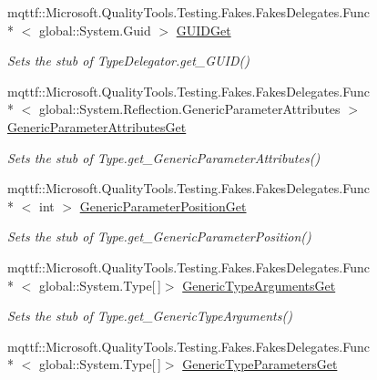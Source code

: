 \begin{DoxyCompactItemize}
mqttf\-::\-Microsoft.\-Quality\-Tools.\-Testing.\-Fakes.\-Fakes\-Delegates.\-Func\\*
$<$ global\-::\-System.\-Guid $>$ \hyperlink{class_system_1_1_reflection_1_1_fakes_1_1_stub_type_delegator_aac3ba8a1bb19e7d3879d708bd54fe156}{G\-U\-I\-D\-Get}
\begin{DoxyCompactList}\small\item\em Sets the stub of Type\-Delegator.\-get\-\_\-\-G\-U\-I\-D()\end{DoxyCompactList}\item 
mqttf\-::\-Microsoft.\-Quality\-Tools.\-Testing.\-Fakes.\-Fakes\-Delegates.\-Func\\*
$<$ global\-::\-System.\-Reflection.\-Generic\-Parameter\-Attributes $>$ \hyperlink{class_system_1_1_reflection_1_1_fakes_1_1_stub_type_delegator_a8bf19976cc8abea414f6892241768330}{Generic\-Parameter\-Attributes\-Get}
\begin{DoxyCompactList}\small\item\em Sets the stub of Type.\-get\-\_\-\-Generic\-Parameter\-Attributes()\end{DoxyCompactList}\item 
mqttf\-::\-Microsoft.\-Quality\-Tools.\-Testing.\-Fakes.\-Fakes\-Delegates.\-Func\\*
$<$ int $>$ \hyperlink{class_system_1_1_reflection_1_1_fakes_1_1_stub_type_delegator_ac1a2e3a2d09a1886b517906f65c48d19}{Generic\-Parameter\-Position\-Get}
\begin{DoxyCompactList}\small\item\em Sets the stub of Type.\-get\-\_\-\-Generic\-Parameter\-Position()\end{DoxyCompactList}\item 
mqttf\-::\-Microsoft.\-Quality\-Tools.\-Testing.\-Fakes.\-Fakes\-Delegates.\-Func\\*
$<$ global\-::\-System.\-Type\mbox{[}$\,$\mbox{]}$>$ \hyperlink{class_system_1_1_reflection_1_1_fakes_1_1_stub_type_delegator_aa72ee4f1371ea3b3bfa8b6a27cc5cdcc}{Generic\-Type\-Arguments\-Get}
\begin{DoxyCompactList}\small\item\em Sets the stub of Type.\-get\-\_\-\-Generic\-Type\-Arguments()\end{DoxyCompactList}\item 
mqttf\-::\-Microsoft.\-Quality\-Tools.\-Testing.\-Fakes.\-Fakes\-Delegates.\-Func\\*
$<$ global\-::\-System.\-Type\mbox{[}$\,$\mbox{]}$>$ \hyperlink{class_system_1_1_reflection_1_1_fakes_1_1_stub_type_delegator_abd7388d08ec00a0c6af1f439168324a6}{Generic\-Type\-Parameters\-Get}

\end{DoxyCompactItemize}
